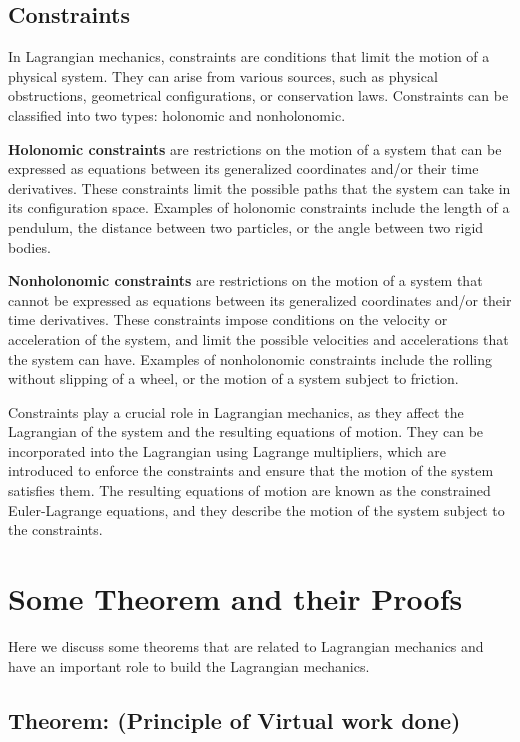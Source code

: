 \documentclass[12pt, a4paper]{article} %
\begin{document}
\subsection{Constraints}

In Lagrangian mechanics, constraints are conditions that limit the motion of a physical system. They can arise from various sources, such as physical obstructions, geometrical configurations, or conservation laws. Constraints can be classified into two types: holonomic and nonholonomic.

{\bf Holonomic constraints} are restrictions on the motion of a system that can be expressed as equations between its generalized coordinates and/or their time derivatives. These constraints limit the possible paths that the system can take in its configuration space. Examples of holonomic constraints include the length of a pendulum, the distance between two particles, or the angle between two rigid bodies.

{\bf Nonholonomic constraints} are restrictions on the motion of a system that cannot be expressed as equations between its generalized coordinates and/or their time derivatives. These constraints impose conditions on the velocity or acceleration of the system, and limit the possible velocities and accelerations that the system can have. Examples of nonholonomic constraints include the rolling without slipping of a wheel, or the motion of a system subject to friction.



Constraints play a crucial role in Lagrangian mechanics, as they affect the Lagrangian of the system and the resulting equations of motion. They can be incorporated into the Lagrangian using Lagrange multipliers, which are introduced to enforce the constraints and ensure that the motion of the system satisfies them. The resulting equations of motion are known as the constrained Euler-Lagrange equations, and they describe the motion of the system subject to the constraints.

\section{Some Theorem and their Proofs}



Here we discuss some theorems that are related to Lagrangian mechanics and have an important role to build the Lagrangian mechanics.

\subsection{Theorem: (Principle of Virtual work done)}
\end{document}

